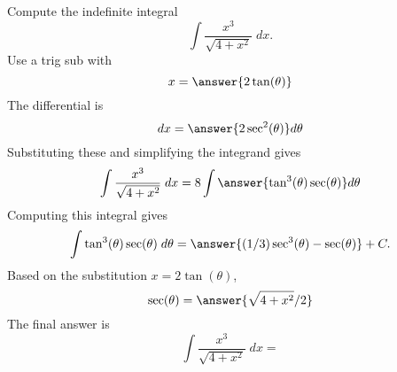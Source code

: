 \documentclass{ximera}
\begin{document}
\begin{problem}
Compute the indefinite integral
\[
\int \frac{x^3}{\sqrt{4 + x^2}} \; dx.
\]
Use a trig sub with\\
\[
x = \answer{2\tan(\theta)}
\]
The differential is\\
\[
dx = \answer{2\sec^2(\theta)}d\theta
\]
Substituting these and simplifying the integrand gives\\
\[
\int \frac{x^3}{\sqrt{4 + x^2}} \; dx = 8\int \answer{\tan^3(\theta)\sec(\theta)} d\theta
\]
Computing this integral gives
\[
\int \tan^3(\theta)\sec(\theta) \; d\theta = \answer{(1/3)\sec^3(\theta) - \sec(\theta)} + C.
\]
Based on the substitution $x = 2\tan(\theta)$, \\
\[
\sec(\theta) = \answer{\sqrt{4+x^2}/2}
\]
The final answer is
\[
\int  \frac{x^3}{\sqrt{4 + x^2}} \; dx = 
\]
\begin{center}
\begin{multipleChoice}
\end{multipleChoice}
\end{center}
\end{problem}
\end{document}
